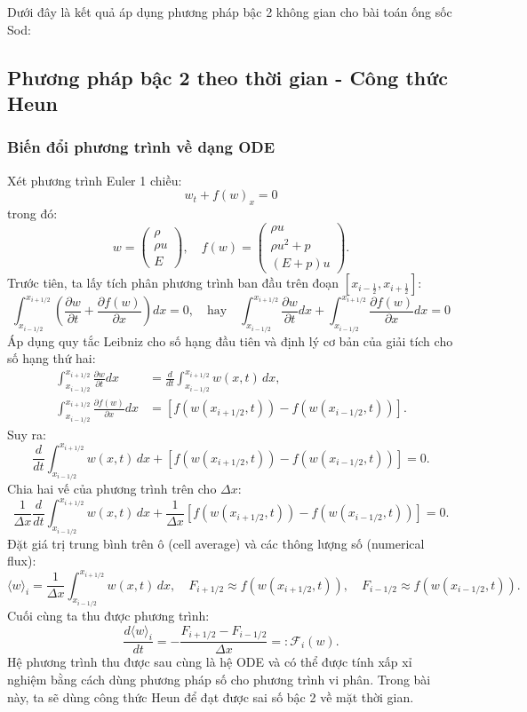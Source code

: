 Dưới đây là kết quả áp dụng phương pháp bậc 2 không gian cho bài toán ống sốc Sod:



\subsection{Phương pháp bậc 2 theo thời gian - Công thức Heun}

\subsubsection{Biến đổi phương trình về dạng ODE}
Xét phương trình Euler 1 chiều:
\begin{equation*}
    w_t + f(w)_x = 0
\end{equation*}
trong đó: 
\[
w = \begin{pmatrix}
    \rho \\ \rho u \\ E
\end{pmatrix}, \quad f(w) = \begin{pmatrix}
    \rho u \\ \rho u^2 + p \\ (E + p)u
\end{pmatrix}.
\]
Trước tiên, ta lấy tích phân phương trình ban đầu trên đoạn $[x_{i-\frac{1}{2}}, x_{i+\frac{1}{2}}]$:
\[
\int_{x_{i-1/2}}^{x_{i+1/2}} \left( \frac{\partial w}{\partial t} + \frac{\partial f(w)}{\partial x} \right) dx = 0, \quad \text{hay} \quad \int_{x_{i-1/2}}^{x_{i+1/2}}  \frac{\partial w}{\partial t} dx + \int_{x_{i-1/2}}^{x_{i+1/2}} \frac{\partial f(w)}{\partial x}  dx = 0
\]
Áp dụng quy tắc Leibniz cho số hạng đầu tiên và định lý cơ bản của giải tích cho số hạng thứ hai:
\begin{align*}
        \int_{x_{i-1/2}}^{x_{i+1/2}}  \frac{\partial w}{\partial t} dx &= \frac{d}{dt} \int_{x_{i-1/2}}^{x_{i+1/2}} w(x,t) \, dx, \\
        \int_{x_{i-1/2}}^{x_{i+1/2}} \frac{\partial f(w)}{\partial x}  dx &= \left[ f(w(x_{i+1/2}, t)) - f(w(x_{i-1/2}, t)) \right].
\end{align*}
Suy ra:
\[
\frac{d}{dt} \int_{x_{i-1/2}}^{x_{i+1/2}} w(x,t) \, dx + \left[ f(w(x_{i+1/2}, t)) - f(w(x_{i-1/2}, t)) \right] = 0.
\]
Chia hai vế của phương trình trên cho $\Delta x$:
\[
\frac{1}{\Delta x}\frac{d}{dt} \int_{x_{i-1/2}}^{x_{i+1/2}} w(x,t) \, dx + \frac{1}{\Delta x}\left[ f(w(x_{i+1/2}, t)) - f(w(x_{i-1/2}, t)) \right] = 0.
\]
Đặt giá trị trung bình trên ô (cell average) và các thông lượng số (numerical flux):
\[
\langle w \rangle_i = \frac{1}{\Delta x}\int_{x_{i-1/2}}^{x_{i+1/2}} w(x,t) \, dx, \quad F_{i+1/2} \approx f(w(x_{i+1/2}, t)), \quad F_{i-1/2} \approx f(w(x_{i-1/2}, t)).
\]
Cuối cùng ta thu được phương trình:
\[
\frac{d\langle w \rangle_i}{dt} = - \frac{F_{i+1/2} - F_{i-1/2}}{\Delta x} =: \mathcal{F}_i(w).
\]
Hệ phương trình thu được sau cùng là hệ ODE và có thể được tính xấp xỉ nghiệm bằng cách dùng phương pháp số cho phương trình vi phân. Trong bài này, ta sẽ dùng công thức Heun để đạt được sai số bậc 2 về mặt thời gian.

